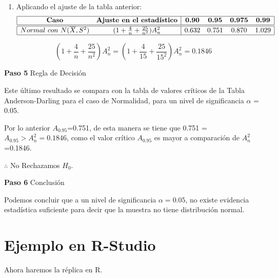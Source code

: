 \documentclass[
  a4paper,
  oneside,
  openany]{book}
\providecommand{\tightlist}{%
  \setlength{\itemsep}{0pt}\setlength{\parskip}{0pt}}
\begin{document}
\begin{enumerate}
\def\labelenumi{\arabic{enumi})}
\setcounter{enumi}{7}
\tightlist
\item
  Aplicando el ajuste de la tabla anterior:
  \[
  \begin{array}{|c c| c c c c|}
  \hline
  \textbf{Caso} & \textbf{Ajuste en el estadístico} &\textbf{0.90} &\textbf{0.95} & \textbf{0.975} & \textbf{0.99} \\
  \hline
  \hline
  Normal\ con\ N(\overline{X},S^2) & (1+\frac{4}{n}+\frac{25}{n^2})A_{n}^{2} & 0.632 & 0.751 & 0.870 & 1.029 \\
  \hline
  \end{array}
  \]
\end{enumerate}

\[ (1+\frac{4}{n}+\frac{25}{n^2})A_{n}^{2}=(1+\frac{4}{15}+\frac{25}{15^2})A_{n}^{2}=0.1846\]

\textbf{Paso 5} Regla de Decisión

Este último resultado se compara con la tabla de valores críticos de la Tabla Anderson-Darling para el caso de Normalidad, para un nivel de significancia \(\alpha\) = 0.05.

Por lo anterior \(A_{0.95}\)=0.751, de esta manera se tiene que 0.751 = \(A_{0.95} > A_{n}^2=0.1846\), como el valor crítico \(A_{0.95}\) es mayor a comparación de \(A_{n}^2\)=0.1846.

\(\therefore\) No Rechazamos \(H_0\).

\textbf{Paso 6} Conclusión

Podemos concluir que a un nivel de significancia \(\alpha=0.05\), no existe evidencia estadística suficiente para decir que la muestra no tiene distribución normal.

\hypertarget{ejemplo-en-r-studio-17}{%
\section{Ejemplo en R-Studio}\label{ejemplo-en-r-studio-17}}

Ahora haremos la réplica en R.
\end{document}
